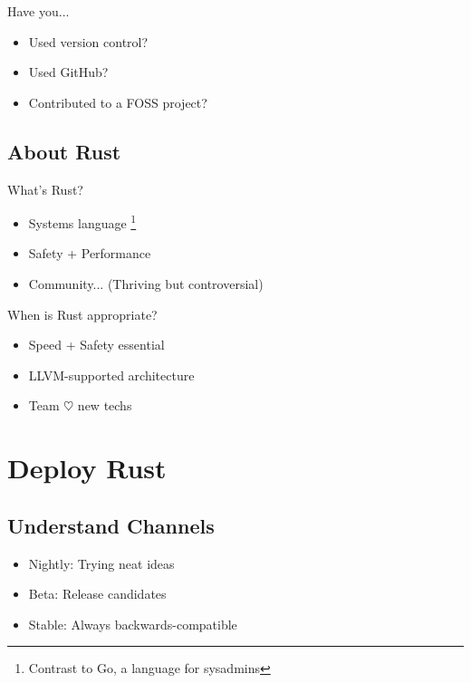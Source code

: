 \documentclass[xcolor={svgnames},hyperref]{beamer}
\begin{document}
    \begin{frame}
        Have you...
        \begin{itemize}
            \item Used version control?
            \item Used GitHub?
            \item Contributed to a FOSS project?
        \end{itemize}
    \end{frame}



    \subsection{About Rust}

    \begin{frame}
        What's Rust?
        \begin{itemize}
            \item Systems language \footnote{Contrast to Go, a language for sysadmins}
            \item Safety + Performance
            \item Community... (Thriving but controversial)
        \end{itemize}
    \end{frame}

    \begin{frame}
        When is Rust appropriate?
        \begin{itemize}
            \item Speed + Safety essential
            \item LLVM-supported architecture
            \item Team $\heartsuit$ new techs
        \end{itemize}
    \end{frame}


\section{Deploy Rust}



    \subsection{Understand Channels}

    \begin{frame}
        \begin{itemize}
            \item Nightly: Trying neat ideas
            \item Beta: Release candidates
            \item Stable: Always backwards-compatible
        \end{itemize}
    \end{frame}
\end{document}
